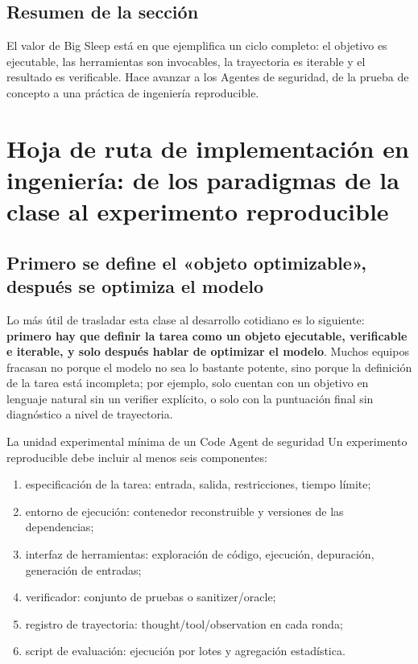 \documentclass[a4paper]{article}
\begin{document}
\subsection{Resumen de la sección}
El valor de Big Sleep está en que ejemplifica un ciclo completo: el objetivo es ejecutable, las herramientas son invocables, la trayectoria es iterable y el resultado es verificable. Hace avanzar a los Agentes de seguridad, de la prueba de concepto a una práctica de ingeniería reproducible.
\section{Hoja de ruta de implementación en ingeniería: de los paradigmas de la clase al experimento reproducible}

\subsection{Primero se define el «objeto optimizable», después se optimiza el modelo}
Lo más útil de trasladar esta clase al desarrollo cotidiano es lo siguiente: \textbf{primero hay que definir la tarea como un objeto ejecutable, verificable e iterable, y solo después hablar de optimizar el modelo}. Muchos equipos fracasan no porque el modelo no sea lo bastante potente, sino porque la definición de la tarea está incompleta; por ejemplo, solo cuentan con un objetivo en lenguaje natural sin un verifier explícito, o solo con la puntuación final sin diagnóstico a nivel de trayectoria.

\begin{importantbox}{La unidad experimental mínima de un Code Agent de seguridad}
Un experimento reproducible debe incluir al menos seis componentes:
\begin{enumerate}
    \item especificación de la tarea: entrada, salida, restricciones, tiempo límite;
    \item entorno de ejecución: contenedor reconstruible y versiones de las dependencias;
    \item interfaz de herramientas: exploración de código, ejecución, depuración, generación de entradas;
    \item verificador: conjunto de pruebas o sanitizer/oracle;
    \item registro de trayectoria: thought/tool/observation en cada ronda;
    \item script de evaluación: ejecución por lotes y agregación estadística.
\end{enumerate}
\end{importantbox}
\end{document}
